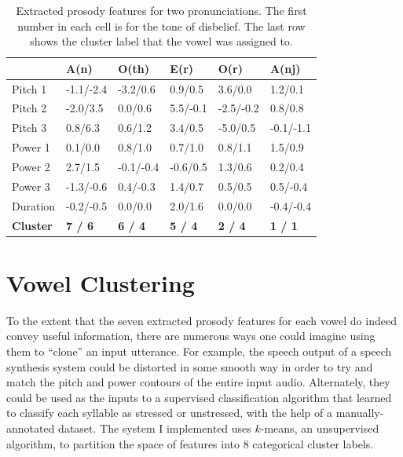 \documentclass{article}
\begin{document}
\begin{table}[]
\centering
\begin{tabular}{|l|l|l|l|l|l|}
\hline
\textbf{}              & \textbf{A(n)}  & \textbf{O(th)} & \textbf{E(r)}  & \textbf{O(r)}  & \textbf{A(nj)} \\ \hline
Pitch 1                & -1.1/-2.4      & -3.2/0.6       & 0.9/0.5        & 3.6/0.0        & 1.2/0.1        \\ \hline
Pitch 2                & -2.0/3.5       & 0.0/0.6        & 5.5/-0.1       & -2.5/-0.2      & 0.8/0.8        \\ \hline
Pitch 3                & 0.8/6.3        & 0.6/1.2        & 3.4/0.5        & -5.0/0.5       & -0.1/-1.1      \\ \hline
Power 1                & 0.1/0.0        & 0.8/1.0        & 0.7/1.0        & 0.8/1.1        & 1.5/0.9        \\ \hline
Power 2                & 2.7/1.5        & -0.1/-0.4      & -0.6/0.5       & 1.3/0.6        & 0.2/0.4        \\ \hline
Power 3                & -1.3/-0.6      & 0.4/-0.3       & 1.4/0.7        & 0.5/0.5        & 0.5/-0.4       \\ \hline
Duration               & -0.2/-0.5      & 0.0/0.0        & 2.0/1.6        & 0.0/0.0        & -0.4/-0.4      \\ \hline
\textbf{Cluster} & \textbf{7 / 6} & \textbf{6 / 4} & \textbf{5 / 4} & \textbf{2 / 4} & \textbf{1 / 1} \\ \hline
\end{tabular}
\caption{Extracted prosody features for two pronunciations. The first number in each cell is for the tone of disbelief. The last row shows the cluster label that the vowel was assigned to.}
\label{table:pitchpow1}
\end{table}

\section{Vowel Clustering}
\label{sec:vowels}

To the extent that the seven extracted prosody features for each vowel do indeed convey useful information, there are numerous ways one could imagine using them to ``clone'' an input utterance.
For example, the speech output of a speech synthesis system could be distorted in some smooth way in order to try and match the pitch and power contours of the entire input audio.
Alternately, they could be used as the inputs to a supervised classification algorithm that learned to classify each syllable as stressed or unstressed, with the help of a manually-annotated dataset.
The system I implemented uses $k$-means, an unsupervised algorithm, to partition the space of features into 8 categorical cluster labels.
\end{document}
